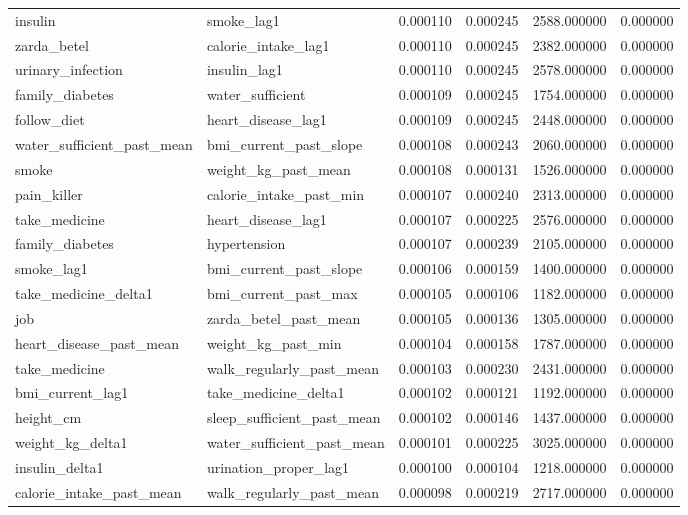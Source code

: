 \begin{longtable}{llrrrr}
insulin & smoke\_lag1 & 0.000110 & 0.000245 & 2588.000000 & 0.000000 \\
zarda\_betel & calorie\_intake\_lag1 & 0.000110 & 0.000245 & 2382.000000 & 0.000000 \\
urinary\_infection & insulin\_lag1 & 0.000110 & 0.000245 & 2578.000000 & 0.000000 \\
family\_diabetes & water\_sufficient & 0.000109 & 0.000245 & 1754.000000 & 0.000000 \\
follow\_diet & heart\_disease\_lag1 & 0.000109 & 0.000245 & 2448.000000 & 0.000000 \\
water\_sufficient\_past\_mean & bmi\_current\_past\_slope & 0.000108 & 0.000243 & 2060.000000 & 0.000000 \\
smoke & weight\_kg\_past\_mean & 0.000108 & 0.000131 & 1526.000000 & 0.000000 \\
pain\_killer & calorie\_intake\_past\_min & 0.000107 & 0.000240 & 2313.000000 & 0.000000 \\
take\_medicine & heart\_disease\_lag1 & 0.000107 & 0.000225 & 2576.000000 & 0.000000 \\
family\_diabetes & hypertension & 0.000107 & 0.000239 & 2105.000000 & 0.000000 \\
smoke\_lag1 & bmi\_current\_past\_slope & 0.000106 & 0.000159 & 1400.000000 & 0.000000 \\
take\_medicine\_delta1 & bmi\_current\_past\_max & 0.000105 & 0.000106 & 1182.000000 & 0.000000 \\
job & zarda\_betel\_past\_mean & 0.000105 & 0.000136 & 1305.000000 & 0.000000 \\
heart\_disease\_past\_mean & weight\_kg\_past\_min & 0.000104 & 0.000158 & 1787.000000 & 0.000000 \\
take\_medicine & walk\_regularly\_past\_mean & 0.000103 & 0.000230 & 2431.000000 & 0.000000 \\
bmi\_current\_lag1 & take\_medicine\_delta1 & 0.000102 & 0.000121 & 1192.000000 & 0.000000 \\
height\_cm & sleep\_sufficient\_past\_mean & 0.000102 & 0.000146 & 1437.000000 & 0.000000 \\
weight\_kg\_delta1 & water\_sufficient\_past\_mean & 0.000101 & 0.000225 & 3025.000000 & 0.000000 \\
insulin\_delta1 & urination\_proper\_lag1 & 0.000100 & 0.000104 & 1218.000000 & 0.000000 \\
calorie\_intake\_past\_mean & walk\_regularly\_past\_mean & 0.000098 & 0.000219 & 2717.000000 & 0.000000 \\

\end{longtable}
